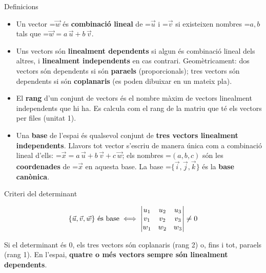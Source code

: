 \documentclass[11pt,a4paper]{article}
\newcommand{\fmm}[1]{\setbox0=\hbox{$#1$}\ifdim\wd0>\linewidth\fmdisp{#1}\else\mbox{\box0}\fi}
\newcommand{\fmdisp}[1]{\[\setbox2=\hbox{$\displaystyle #1$}\ifdim\wd2>\linewidth\resizebox{\linewidth}{!}{\box2}\else\box2\fi\]}
\begin{document}
\begin{fmdef}{Definicions}
\begin{itemize}
\item Un vector \fmm{\vec w} és \textbf{combinació lineal} de \fmm{\vec u} i \fmm{\vec v} si existeixen nombres \fmm{a,b} tals que \fmm{\vec w=a\,\vec u+b\,\vec v}.
\item Uns vectors són \textbf{linealment dependents} si algun és combinació lineal dels altres, i \textbf{linealment independents} en cas contrari. Geomètricament: dos vectors són dependents si són \textbf{para\lgem{}els} (proporcionals); tres vectors són dependents si són \textbf{coplanaris} (es poden dibuixar en un mateix pla).
\item El \textbf{rang} d'un conjunt de vectors és el nombre màxim de vectors linealment independents que hi ha. Es calcula com el rang de la matriu que té els vectors per files (unitat 1).
\item Una \textbf{base} de l'espai és qualsevol conjunt de \textbf{tres vectors linealment independents}. Llavors tot vector s'escriu de manera única com a combinació lineal d'ells: \fmm{\vec x=a\,\vec u+b\,\vec v+c\,\vec w}; els nombres \fmm{(a,b,c)} són les \textbf{coordenades} de \fmm{\vec x} en aquesta base. La base \fmm{\{\vec i,\vec j,\vec k\}} és la \textbf{base canònica}.
\end{itemize}
\end{fmdef}

\begin{fmprop}{Criteri del determinant}

\fmdisp{\{\vec u,\vec v,\vec w\}\ \text{és base} \iff\begin{vmatrix}u_1&u_2&u_3\\v_1&v_2&v_3\\w_1&w_2&w_3\end{vmatrix}\neq0}

Si el determinant és 0, els tres vectors són coplanaris (rang 2) o, fins i tot, para\lgem{}els (rang 1). En l'espai, \textbf{quatre o més vectors sempre són linealment dependents}.
\end{fmprop}
\end{document}
